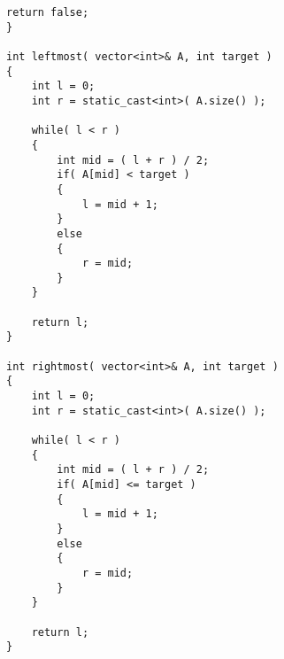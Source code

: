 \begin{lstlisting}[style=customc, caption={Hash Map}]
    return false;
}

int leftmost( vector<int>& A, int target )
{
    int l = 0;
    int r = static_cast<int>( A.size() );

    while( l < r )
    {
        int mid = ( l + r ) / 2;
        if( A[mid] < target )
        {
            l = mid + 1;
        }
        else
        {
            r = mid;
        }
    }

    return l;
}

int rightmost( vector<int>& A, int target )
{
    int l = 0;
    int r = static_cast<int>( A.size() );

    while( l < r )
    {
        int mid = ( l + r ) / 2;
        if( A[mid] <= target )
        {
            l = mid + 1;
        }
        else
        {
            r = mid;
        }
    }

    return l;
}
\end{lstlisting}